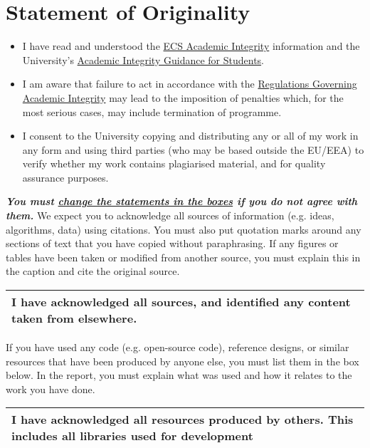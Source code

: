 \section*{Statement of Originality}

\begin{itemize}
  \item I have read and understood the \href{}{ECS Academic Integrity}
        information and the University's \href{}{Academic Integrity
        Guidance for Students}.
  \item I am aware that failure to act in accordance with the \href{}
        {Regulations Governing Academic Integrity} may lead to the
        imposition of penalties which, for the most serious cases, may 
        include termination of programme.
  \item I consent to the University copying and distributing any or all 
        of my work in any form and using third parties (who may be based 
        outside the EU/EEA) to verify whether my work contains plagiarised 
        material, and for quality assurance purposes.
\end{itemize}
\vspace{2mm}
\noindent\textbf{\textit{You must \underline{change the statements in the boxes} if 
you do not agree with them.}}
\x
\noindent We expect you to acknowledge all sources of information (e.g. ideas, algorithms, data) using
citations. You must also put quotation marks around any sections of text that you have copied
without paraphrasing. If any figures or tables have been taken or modified from another source,
you must explain this in the caption and cite the original source.

\begin{longtable}[ht]{ | p{\textwidth} | }
  \hline
  \textbf{ I have acknowledged all sources, and identified any content taken from elsewhere.}
  \\\hline
\end{longtable}

\noindent If you have used any code (e.g. open-source code), reference designs, or similar resources that
have been produced by anyone else, you must list them in the box below. In the report, you must
explain what was used and how it relates to the work you have done.

\begin{longtable}[ht]{ | p{\textwidth} | }
  \hline
  \textbf{I have acknowledged all resources produced by others. This includes all libraries used for development}
  \\\hline
\end{longtable}

